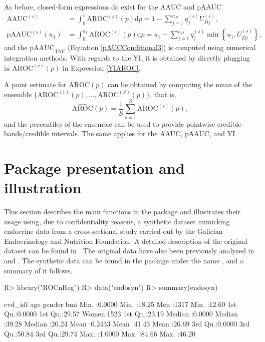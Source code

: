 As before, closed-form expressions do exist for the AAUC and pAAUC
\begin{align*}
\text{AAUC}^{(s)}&=\int_{0}^{1}\text{AROC}^{(s)}(p)\text{d}p=1-\sum_{j=1}^{n_D}q_j^{(s)}U_{Dj}^{(s)},\\
\text{pAAUC}^{(s)}(u_1)&=\int_{0}^{u_1}\text{AROC}^{(s)}(p)\text{d}p=u_1-\sum_{j=1}^{n_D}q_j^{(s)}\min\left\{u_1,U_{Dj}^{(s)}\right\},
\end{align*}
and the $\text{pAAUC}_{\text{TNF}}$  (Equation \eqref{pAUCConditional3}) is computed using numerical integration methods.
With regards to the YI, it is obtained by directly plugging in $\text{AROC}^{(s)}(p)$ in Expression \eqref{YIAROC}.

A point estimate for $\text{AROC}(p)$ can be obtained by computing the mean of the ensemble $\{\text{AROC}^{(1)}(p),\ldots,\text{AROC}^{(S)}(p)\}$, that is,
\begin{equation*}
\widehat{\text{AROC}}(p)=\frac{1}{S}\sum_{s=1}^{S}\text{AROC}^{(s)}(p), %
\end{equation*}
and the percentiles of the ensemble can be used to provide pointwise credible bands/credible intervals. The same applies for the AAUC, pAAUC, and YI.

\section{Package presentation and illustration} \label{sec:illustration}
This section describes the main functions in the  package and illustrates their usage using, due to confidentiality reasons, a synthetic dataset mimicking endocrine data from a cross-sectional study carried out by the Galician Endocrinology and Nutrition Foundation. A detailed description of the original dataset can be found in \cite{Tome09}. The original data have also been previously analyzed in \cite{MX11a, MX11b} and \cite{Inacio18}.  The synthetic data can be found in the  package under the name , and a summary of it follows.

\begin{example}
R> library("ROCnReg")
R> data("endosyn")
R> summary(endosyn)

   cvd_idf            age          gender          bmi       
Min.   :0.0000   Min.   :18.25   Men  :1317   Min.   :12.60  
1st Qu.:0.0000   1st Qu.:29.57   Women:1523   1st Qu.:23.19  
Median :0.0000   Median :39.28                Median :26.24  
Mean   :0.2433   Mean   :41.43                Mean   :26.69  
3rd Qu.:0.0000   3rd Qu.:50.84                3rd Qu.:29.74  
Max.   :1.0000   Max.   :84.66                Max.   :46.20 
\end{example}

